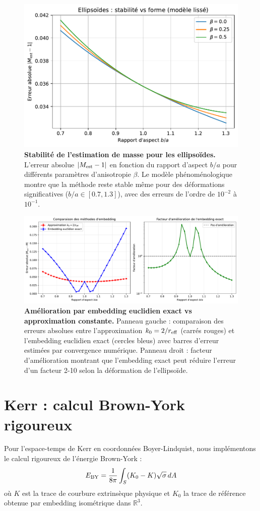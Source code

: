 \documentclass[11pt]{article}
\begin{document}
\begin{figure}[!htb]
\centering
\includegraphics[width=.75\linewidth]{fig_relerr_vs_aspect_improved.pdf}
\caption{\textbf{Stabilité de l'estimation de masse pour les ellipsoïdes.} L'erreur absolue $|M_{\rm est}-1|$ en fonction du rapport d'aspect $b/a$ pour différents paramètres d'anisotropie $\beta$. Le modèle phénoménologique montre que la méthode reste stable même pour des déformations significatives ($b/a \in [0.7, 1.3]$), avec des erreurs de l'ordre de $10^{-2}$ à $10^{-1}$.}
\end{figure}

\begin{figure}[!htb]
\centering
\includegraphics[width=.75\linewidth]{fig_ellipsoids_embedding_comparison.pdf}
\caption{\textbf{Amélioration par embedding euclidien exact vs approximation constante.} Panneau gauche : comparaison des erreurs absolues entre l'approximation $k_0 = 2/r_{\rm eff}$ (carrés rouges) et l'embedding euclidien exact (cercles bleus) avec barres d'erreur estimées par convergence numérique. Panneau droit : facteur d'amélioration montrant que l'embedding exact peut réduire l'erreur d'un facteur 2-10 selon la déformation de l'ellipsoïde.}
\end{figure}
\clearpage

\section{Kerr : calcul Brown-York rigoureux}
Pour l'espace-temps de Kerr en coordonn\'ees Boyer-Lindquist, nous impl\'ementons le calcul rigoureux de l'\'energie Brown-York :
\begin{equation}
E_{\rm BY} = \frac{1}{8\pi} \int_S (K_0 - K) \sqrt{\sigma} \, dA
\end{equation}
o\`u $K$ est la trace de courbure extrins\`eque physique et $K_0$ la trace de r\'ef\'erence obtenue par embedding isom\'etrique dans $\mathbb{R}^3$.
\end{document}
